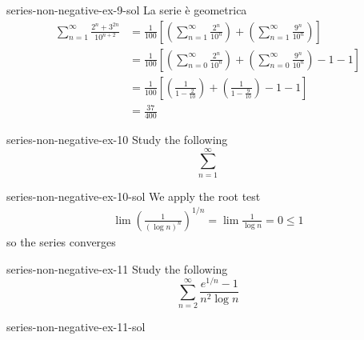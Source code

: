 \documentclass[preview]{standalone}
\begin{document}
\begin{snippetsolution}{series-non-negative-ex-9-sol}{}
    La serie è geometrica
    \begin{align*}
        \sum_{n=1}^\infty \frac{
            2^n + 3^{2n}
        }{
            10^{n+2}
        } &=
        \frac{1}{100} \left[
            \left(\sum_{n=1}^\infty \frac{
            2^n
        }{
            10^{n}
        }\right)
        +
        \left(\sum_{n=1}^\infty \frac{
            9^{n}
        }{
            10^{n}
        }\right)
        \right]
        \\
        &= 
        \frac{1}{100} \left[
            \left(\sum_{n=0}^\infty \frac{
            2^n
        }{
            10^{n}
        }\right)
        +
        \left(\sum_{n=0}^\infty \frac{
            9^{n}
        }{
            10^{n}
        }\right)
        -1-1
        \right]
        \\
        &= 
        \frac{1}{100} \left[
            \left(\frac{1}{1 - \frac{2}{10}}\right)
        +
        \left(\frac{1}{1 - \frac{9}{10}}\right)
        -1-1
        \right] \\
        &= \frac{37}{400}
    \end{align*}
\end{snippetsolution}

\begin{snippetexercise}{series-non-negative-ex-10}{}
    Study the following \series
    \[
        \sum_{n=1}^\infty 
    \]
\end{snippetexercise}

\begin{snippetsolution}{series-non-negative-ex-10-sol}{}
    We apply the root test
    \begin{align*}
        \lim {(\frac{
            1
        }{
            {(\log n)}^n
        })}^{1/n}
        = \lim \frac{1}{\log n} = 0 \leq 1
    \end{align*}
    so the series converges
\end{snippetsolution}

\begin{snippetexercise}{series-non-negative-ex-11}{}
    Study the following \series
    \[
        \sum_{n=2}^\infty \frac{
            e^{1/n} - 1
        }{
            n^2 \log n
        }
    \] %
\end{snippetexercise}

\begin{snippetsolution}{series-non-negative-ex-11-sol}{}
    \todo
\end{snippetsolution}
\end{document}
